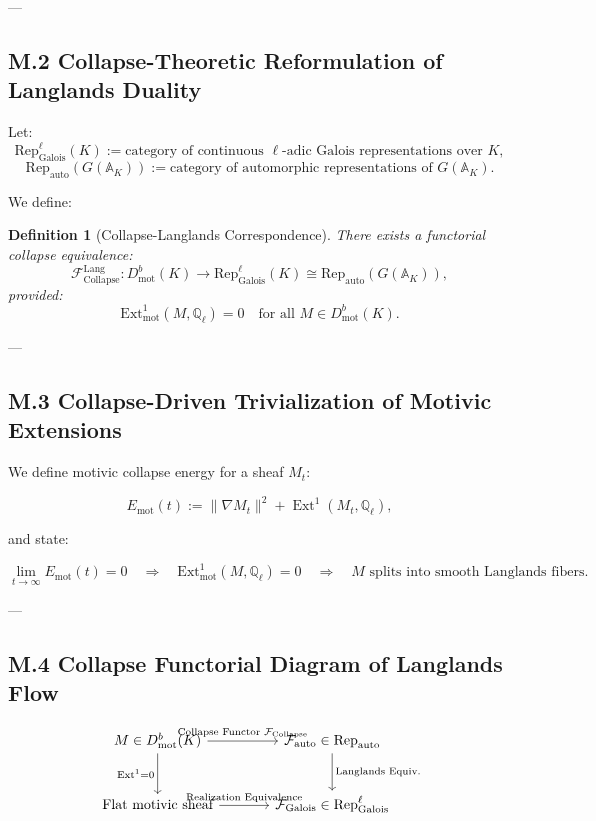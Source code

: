\documentclass[11pt]{article}
\newtheorem{definition}[theorem]{Definition}
\begin{document}
---

\subsection*{M.2 Collapse-Theoretic Reformulation of Langlands Duality}

Let:
\[
\mathrm{Rep}_\mathrm{Galois}^\ell(K) := \text{category of continuous } \ell\text{-adic Galois representations over } K,
\]
\[
\mathrm{Rep}_\mathrm{auto}(G(\mathbb{A}_K)) := \text{category of automorphic representations of } G(\mathbb{A}_K).
\]

We define:

\begin{definition}[Collapse-Langlands Correspondence]
There exists a functorial collapse equivalence:
\[
\mathcal{F}_{\mathrm{Collapse}}^{\mathrm{Lang}} :
D^b_{\mathrm{mot}}(K) \to \mathrm{Rep}_\mathrm{Galois}^\ell(K) \cong \mathrm{Rep}_\mathrm{auto}(G(\mathbb{A}_K)),
\]
provided:
\[
\mathrm{Ext}^1_{\mathrm{mot}}(M, \mathbb{Q}_\ell) = 0
\quad \text{for all } M \in D^b_{\mathrm{mot}}(K).
\]
\end{definition}

---

\subsection*{M.3 Collapse-Driven Trivialization of Motivic Extensions}

We define motivic collapse energy for a sheaf $M_t$:

\[
E_{\mathrm{mot}}(t) := \|\nabla M_t\|^2 + \operatorname{Ext}^1(M_t, \mathbb{Q}_\ell),
\]

and state:

\begin{proposition}
\[
\lim_{t \to \infty} E_{\mathrm{mot}}(t) = 0
\quad \Rightarrow \quad
\mathrm{Ext}^1_{\mathrm{mot}}(M, \mathbb{Q}_\ell) = 0
\quad \Rightarrow \quad
M \text{ splits into smooth Langlands fibers}.
\]
\end{proposition}

---

\subsection*{M.4 Collapse Functorial Diagram of Langlands Flow}

\[
\begin{tikzcd}[row sep=large, column sep=large]
M \in D^b_{\mathrm{mot}}(K) \arrow[r, "\text{Collapse Functor } \mathcal{F}_{\mathrm{Collapse}}"] \arrow[d, swap, "\mathrm{Ext}^1 = 0"]
& \mathcal{F}_{\mathrm{auto}} \in \mathrm{Rep}_{\mathrm{auto}} \arrow[d, "\text{Langlands Equiv.}"] \\
\text{Flat motivic sheaf} \arrow[r, "\text{Realization Equivalence}"]
& \mathcal{F}_{\mathrm{Galois}} \in \mathrm{Rep}_\mathrm{Galois}^\ell
\end{tikzcd}
\]
\end{document}
